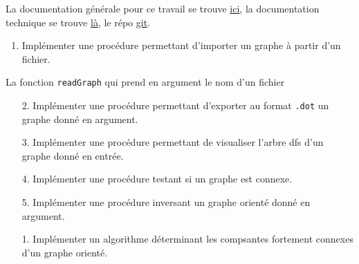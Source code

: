 \documentclass[10pt]{article} %
\begin{document}
\vspace{1cm}

La documentation générale pour ce travail se trouve \href{https://polytech-sorbonne-main-tp2.readthedocs.io/en/latest/}{ici}, la documentation
technique se trouve \href{https://ejovo13.github.io/DSA_TP1/}{là}, le répo \href{https://github.com/ejovo13/DSA_TP1}{git}.

\vspace{1cm}
\noindent {} 

\begin{enumerate}
    \item Implémenter une procédure permettant d'importer un graphe à partir d'un fichier.
\end{enumerate}

La fonction \texttt{readGraph} qui prend en argument le nom d'un fichier

\begin{itemize}
    \item [2.] Implémenter une procédure permettant d'exporter au format \texttt{.dot} un graphe donné en argument.
\end{itemize}

\begin{itemize}
    \item [3.] Implémenter une procédure permettant de visualiser l'arbre dfs d'un graphe donné en entrée.
\end{itemize}

\begin{itemize}
    \item [4.] Implémenter une procédure testant si un graphe est connexe.
\end{itemize}

\begin{itemize}
    \item [5.] Implémenter une procédure inversant un graphe orienté donné en argument.
\end{itemize}

\vspace{.5cm}
\noindent {} 

\begin{itemize}
    \item [1.] Implémenter un algorithme déterminant les compsantes fortement connexes d'un graphe orienté.
\end{itemize}
\end{document}
